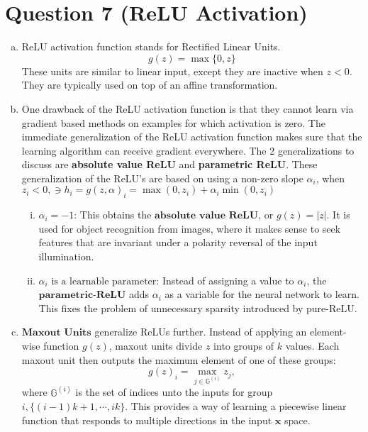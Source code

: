 \documentclass[fleqn]{article}
\DeclareMathOperator*{\argmax}{max}
\DeclareMathOperator*{\argmin}{min}
\begin{document}
\section*{Question 7 (ReLU Activation)}
\begin{enumerate}[a)]
    \item 
    ReLU activation function stands for Rectified Linear Units.\\
    
    \begin{equation*}
        g(z) = \argmax\{0, z\}
    \end{equation*}
    These units are similar to linear input, except they are inactive when $z < 0$. They are typically used on top of 
    an affine transformation.
    
    \item 
    One drawback of the ReLU activation function is that they cannot learn via gradient based methods on 
    examples for which activation is zero. The immediate generalization of the ReLU activation function makes 
    sure that the learning algorithm can receive gradient everywhere. The 2 generalizations to discuss are 
    \textbf{absolute value ReLU} and \textbf{parametric ReLU}.
    These generalization of the ReLU's are based on using a non-zero slope $\alpha_i$, when $z_i < 0, \ni h_i = 
    g(z, \alpha)_i = \argmax(0, z_i) + \alpha_i \argmin(0, z_i)$
    \begin{enumerate}[i)]
    \item $\alpha_i = -1$: This obtains the $\textbf{absolute value ReLU}$, or $g(z) = |z|$. It is used for object 
    recognition from images, where it makes sense to seek features that are invariant under a polarity reversal of 
    the input illumination.
    \item $\alpha_i \text{ is a learnable parameter}$: Instead of assigning a value to $\alpha_i$, the
    $\textbf{parametric-ReLU}$ adds $\alpha_i$ as a variable for the neural network to learn. This fixes the 
    problem of unnecessary sparsity introduced by pure-ReLU.
    \end{enumerate}
    
    \item
    $\textbf{Maxout Units}$ generalize ReLUs further. Instead of applying an element-wise function $g(z)$,
    maxout units divide $z$ into groups of $k$ values. Each maxout unit then outputs the maximum element of 
    one of these groups:
    \vspace{30 mm}
    \begin{equation*}
    	g(z)_i = \argmax_{j \in \mathbb{G}^{(i)}} z_j, 
    \end{equation*}
    where $\mathbb{G}^{(i)}$ is the set of indices unto the inputs for group $i, \{(i-1)k+1, \cdots, ik\}$. This 
    provides a way of learning a piecewise linear function that responds to multiple directions in the input 
    $\bm{x}$ space.\\
    

\end{enumerate}
\end{document}
